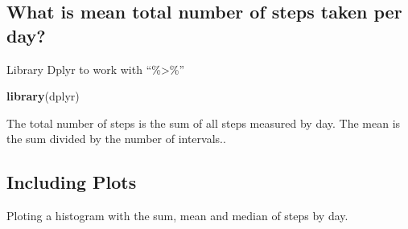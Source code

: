 \documentclass[]{article}
\newenvironment{Shaded}{\begin{snugshade}}{\end{snugshade}}
\newcommand{\DataTypeTok}[1]{\textcolor[rgb]{0.13,0.29,0.53}{#1}}
\newcommand{\KeywordTok}[1]{\textcolor[rgb]{0.13,0.29,0.53}{\textbf{#1}}}
\newcommand{\NormalTok}[1]{#1}
\newcommand{\OperatorTok}[1]{\textcolor[rgb]{0.81,0.36,0.00}{\textbf{#1}}}
\newcommand{\StringTok}[1]{\textcolor[rgb]{0.31,0.60,0.02}{#1}}
\begin{document}
\hypertarget{what-is-mean-total-number-of-steps-taken-per-day}{%
\subsection{What is mean total number of steps taken per
day?}\label{what-is-mean-total-number-of-steps-taken-per-day}}

Library Dplyr to work with ``\%\textgreater{}\%''

\begin{Shaded}
\begin{Highlighting}[]
\KeywordTok{library}\NormalTok{(dplyr)}
\end{Highlighting}
\end{Shaded}

The total number of steps is the sum of all steps measured by day. The
mean is the sum divided by the number of intervals..

\begin{Shaded}
\end{Shaded}

\hypertarget{including-plots}{%
\subsection{Including Plots}\label{including-plots}}

Ploting a histogram with the sum, mean and median of steps by day.
\end{document}
